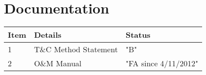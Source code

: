 \section{Documentation}

\begin{tabular}{lll}
\toprule
Item & Details & Status\\
\midrule
1    & T\&C Method Statement & "B"\\
2    & O\&M Manual           & "FA since 4/11/2012" \\
\bottomrule
\end{tabular}
















